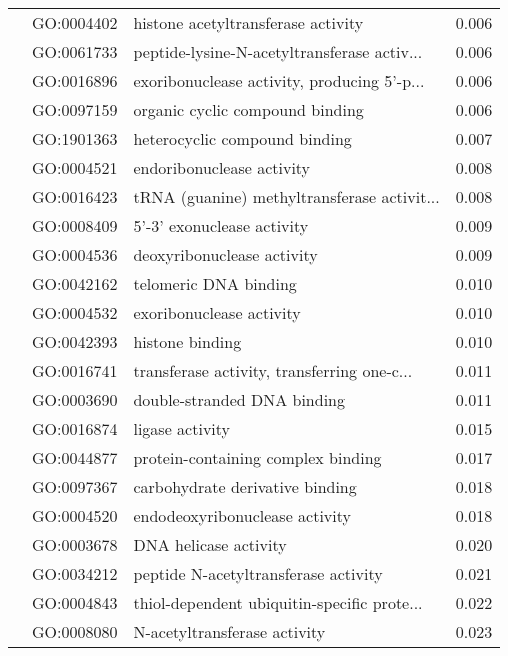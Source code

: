 \begin{longtable}{lllr}
   & GO:0004402 &           histone acetyltransferase activity &         0.006 \\
   & GO:0061733 &  peptide-lysine-N-acetyltransferase activ... &         0.006 \\
   & GO:0016896 &  exoribonuclease activity, producing 5'-p... &         0.006 \\
   & GO:0097159 &              organic cyclic compound binding &         0.006 \\
   & GO:1901363 &                heterocyclic compound binding &         0.007 \\
   & GO:0004521 &                    endoribonuclease activity &         0.008 \\
   & GO:0016423 &  tRNA (guanine) methyltransferase activit... &         0.008 \\
   & GO:0008409 &                   5'-3' exonuclease activity &         0.009 \\
   & GO:0004536 &                   deoxyribonuclease activity &         0.009 \\
   & GO:0042162 &                        telomeric DNA binding &         0.010 \\
   & GO:0004532 &                     exoribonuclease activity &         0.010 \\
   & GO:0042393 &                              histone binding &         0.010 \\
   & GO:0016741 &  transferase activity, transferring one-c... &         0.011 \\
   & GO:0003690 &                  double-stranded DNA binding &         0.011 \\
   & GO:0016874 &                              ligase activity &         0.015 \\
   & GO:0044877 &           protein-containing complex binding &         0.017 \\
   & GO:0097367 &              carbohydrate derivative binding &         0.018 \\
   & GO:0004520 &               endodeoxyribonuclease activity &         0.018 \\
   & GO:0003678 &                        DNA helicase activity &         0.020 \\
   & GO:0034212 &         peptide N-acetyltransferase activity &         0.021 \\
   & GO:0004843 &  thiol-dependent ubiquitin-specific prote... &         0.022 \\
   & GO:0008080 &                 N-acetyltransferase activity &         0.023 \\

\end{longtable}
